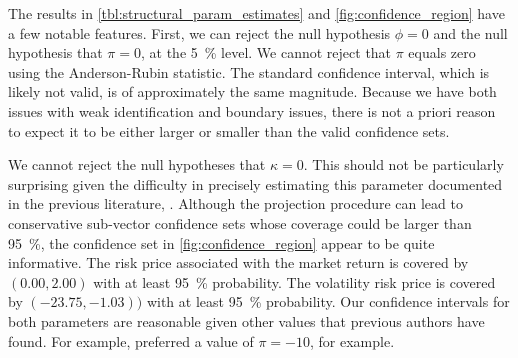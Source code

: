 
  



The results in \cref{tbl:structural_param_estimates} and \cref{fig:confidence_region} have a few notable features. First, we can reject the null hypothesis $\phi = 0$ and the null hypothesis that $\pi = 0$, at the \SI{5}{\percent} level. We cannot reject that $\pi$ equals zero using the Anderson-Rubin statistic. The standard confidence interval, which is likely not valid, is of approximately the same magnitude. Because we have both issues with weak identification and boundary issues, there is not a priori reason to expect it to be either larger or smaller than the valid confidence sets.  

We cannot reject the null hypotheses that $\kappa = 0$. This should not be particularly surprising given the difficulty in precisely estimating this parameter documented in the previous literature, \parencites{lettau2010measuring}. Although the projection procedure can lead to conservative sub-vector confidence sets whose coverage could be larger than \SI{95}{\percent}, the confidence set in \cref{fig:confidence_region} appear to be quite informative. The risk price associated with the market return is covered by $(0.00, 2.00)$ with at least \SI{95}{\percent} probability. The volatility risk price is covered by $(-23.75, -1.03))$ with at least \SI{95}{\percent} probability. Our confidence intervals for both parameters are reasonable given other values that previous authors have found. For example, \Textcite{han2018leverage} preferred a value of $\pi = -10$, for example. 

